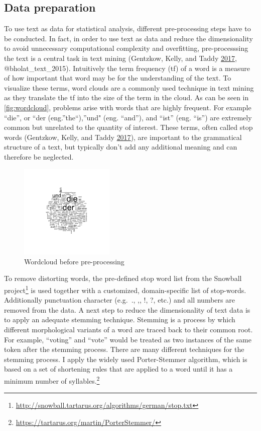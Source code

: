 \documentclass[
]{article}
\begin{document}
\hypertarget{data-preparation}{%
\subsection{Data preparation}\label{data-preparation}}

To use text as data for statistical analysis, different pre-processing
steps have to be conducted. In fact, in order to use text as data and
reduce the dimensionality to avoid unnecessary computational complexity
and overfitting, pre-processsing the text is a central task in text
mining (Gentzkow, Kelly, and Taddy
\protect\hyperlink{ref-gentzkow_text_2017}{2017}, @bholat\_text\_2015).
Intuitively the term frequency (tf) of a word is a measure of how
important that word may be for the understanding of the text. To
visualize these terms, word clouds are a commonly used technique in text
mining as they translate the tf into the size of the term in the cloud.
As can be seen in \autoref{fig:wordcloud}, problems arise with words
that are highly frequent. For example ``die'', or ``der
(eng.''the``),''und" (eng. ``and''), and ``ist'' (eng. ``is'') are
extremely common but unrelated to the quantity of interest. These terms,
often called stop words (Gentzkow, Kelly, and Taddy
\protect\hyperlink{ref-gentzkow_text_2017}{2017}), are important to the
grammatical structure of a text, but typically don't add any additional
meaning and can therefore be neglected.

\begin{figure}
\centering
\includegraphics[width=0.4\textwidth,height=\textheight]{../figs/wordcloud.png}
\caption{Wordcloud before pre-processing}
\end{figure}

To remove distorting words, the pre-defined stop word list from the
Snowball project\footnote{\url{http://snowball.tartarus.org/algorithms/german/stop.txt}}
is used together with a customized, domain-specific list of stop-words.
Additionally punctuation character (e.g.~., ,, !, ?, etc.) and all
numbers are removed from the data. A next step to reduce the
dimensionality of text data is to apply an adequate stemming technique.
Stemming is a process by which different morphological variants of a
word are traced back to their common root. For example, ``voting'' and
``vote'' would be treated as two instances of the same token after the
stemming process. There are many different techniques for the stemming
process. I apply the widely used Porter-Stemmer algorithm, which is
based on a set of shortening rules that are applied to a word until it
has a minimum number of syllables.\footnote{\url{https://tartarus.org/martin/PorterStemmer/}}
\end{document}
